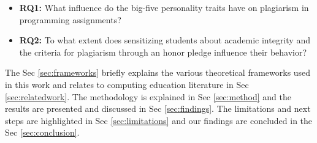 \begin{itemize}
    \item \label{RQ1} \textbf{RQ1:} What influence do the big-five personality traits have on plagiarism in programming assignments?
    \item \label{RQ2} \textbf{RQ2:} To what extent does sensitizing students about academic integrity and the criteria for plagiarism through an honor pledge influence their behavior?
\end{itemize}

The Sec \ref{sec:frameworks} briefly explains the various theoretical frameworks used in this work and relates to computing education literature in Sec \ref{sec:relatedwork}. The methodology is explained in Sec \ref{sec:method} and the results are presented and discussed in Sec \ref{sec:findings}. The limitations and next steps are highlighted in Sec \ref{sec:limitations} and our findings are concluded in the Sec \ref{sec:conclusion}. 

